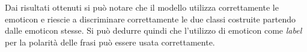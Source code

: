 \documentclass[a4paper,12pt,openright,twoside]{report}
\theoremstyle{definition}
\begin{document}
Dai risultati ottenuti si può notare che il modello utilizza correttamente le emoticon e riescie a discriminare
correttamente le due classi costruite partendo dalle emoticon stesse. Si può dedurre quindi che l'utilizzo
di emoticon come \emph{label} per la polarità delle frasi può essere usata correttamente.
\end{document}
